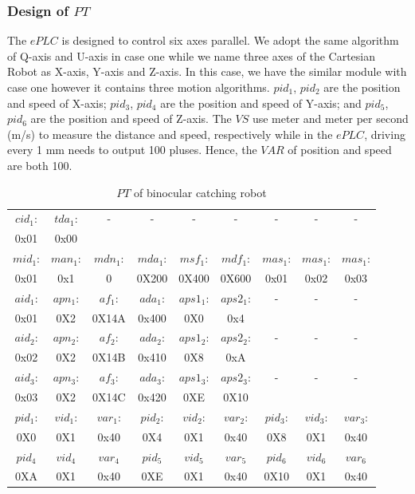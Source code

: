 \documentclass[journal,UTF8]{IEEEtran}
\begin{document}
\subsubsection{Design of $PT$}
The $ePLC$ is designed to control six axes parallel. We adopt the same algorithm of Q-axis and U-axis in case one while we name three axes of the Cartesian Robot as X-axis, Y-axis and Z-axis. In this case, we have the similar module with case one however it contains three motion algorithms. $pid_1$, $pid_2$ are the position and speed of X-axis; $pid_3$, $pid_4$ are the position and speed of Y-axis; and $pid_5$, $pid_6$ are the position and speed of Z-axis. The $VS$ use meter and meter per second (m/s) to measure the distance and speed, respectively while in the $ePLC$, driving every 1 mm needs to output 100 pluses. Hence, the $VAR$ of position and speed are both 100.    
\begin{table}
	\scriptsize \caption{$PT$ of binocular catching robot}
	\label{table:PTofRobot}
	\begin{center}
		\renewcommand{\arraystretch}{1.4}
		\setlength\tabcolsep{3pt}
		\begin{tabular}{|c|c|c|c|c|c|c|c|c|}
			\hline
			$cid_1$:  & $tda_1$:   &- &-& -  &- &-&-&- \\
			0x01&0x00&& &&&&&\\
			\hline
			$mid_1$:&$man_1$:&$mdn_1$:&$mda_1$:&$msf_1$:&$mdf_1$:&$mas_1$:&$mas_1$:&$mas_1$:\\
			0x01  &0x1 &   0    &0X200  &0X400  & 0X600 &0x01   &0x02   &0x03 \\
			\hline
			$aid_1$:  & $apn_1$:& $af_1$: &$ada_1$: &$aps1_1$:  &$aps2_1$:&-&-&-\\
			0x01     & 0X2    & 0X14A  &0x400 &0X0   &0x4 &&&\\
			\hline
			$aid_2$:  & $apn_2$:& $af_2$: &$ada_2$: &$aps1_2$:  &$aps2_2$:&-&-&-\\
			0x02     & 0X2    & 0X14B  &0x410  &0X8       &0xA &&&\\
			\hline
			$aid_3$:&$apn_3$:&$af_3$:&$ada_3$:&$aps1_3$:&$aps2_3$:&-&-&-\\
			0x03     & 0X2    & 0X14C  &0x420   &0XE       &0X10 &&&\\
			\hline
			$pid_1$:&$vid_1$:&$var_1$:&$pid_2$:&$vid_2$:&$var_2$: &$pid_3$:&$vid_3$:&$var_3$:\\
			0X0      & 0X1    & 0x40  &0X4     &0X1    & 0x40  &0X8      & 0X1    & 0x40\\
			\hline
			$pid_4$  &$vid_4$ &$var_4$ &$pid_5$ &$vid_5$&$var_5$ &$pid_6$  &$vid_6$ &$var_6$\\
			\hline
			0XA      & 0X1    & 0x40  &0XE     &0X1    & 0x40  &0X10     & 0X1    & 0x40\\
			\hline
		\end{tabular}
	\end{center}
\end{table}
\end{document}
